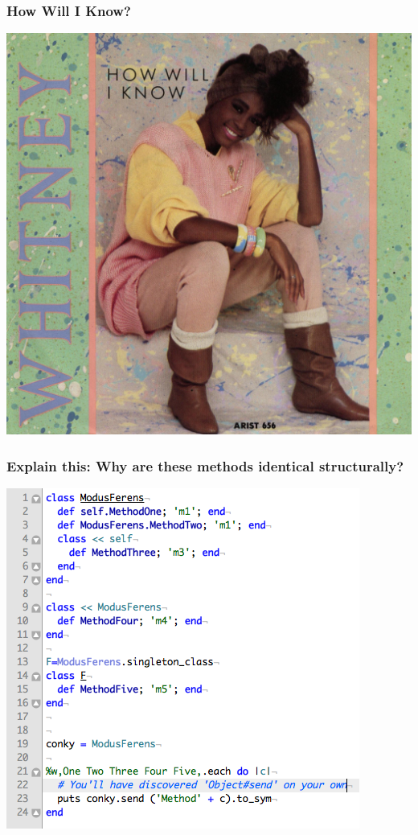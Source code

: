 \documentclass[slidestop,compress,mathserif]{beamer}
\begin{document}
\begin{frame}
	\frametitle{How Will I Know?}
	\begin{center}
		\includegraphics[scale=0.10]{img/whitney.jpg}
	\end{center}
\end{frame}

\begin{frame}
	\frametitle{Explain this: Why are these methods identical structurally?}
	\includegraphics[scale=0.50]{img/challenge.png}
\end{frame}
\end{document}
